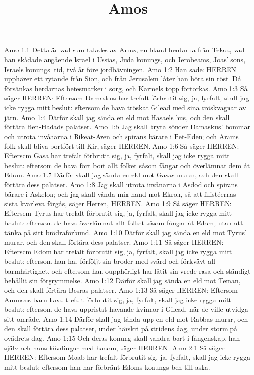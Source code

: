 

\title{Amos}

Amo 1:1  Detta är vad som talades av Amos, en bland herdarna från Tekoa, vad han skådade angående Israel i Ussias, Juda konungs, och Jerobeams, Joas' sons, Israels konungs, tid, två år före jordbävningen.
Amo 1:2  Han sade: HERREN upphäver ett rytande från Sion, och från Jerusalem låter han höra sin röst. Då försänkas herdarnas betesmarker i sorg, och Karmels topp förtorkas.
Amo 1:3  Så säger HERREN: Eftersom Damaskus har trefalt förbrutit sig, ja, fyrfalt, skall jag icke rygga mitt beslut: eftersom de hava tröskat Gilead med sina tröskvagnar av järn.
Amo 1:4  Därför skall jag sända en eld mot Hasaels hus, och den skall förtära Ben-Hadads palatser.
Amo 1:5  Jag skall bryta sönder Damaskus' bommar och utrota invånarna i Bikeat-Aven och spirans bärare i Bet-Eden; och Arams folk skall bliva bortfört till Kir, säger HERREN.
Amo 1:6  Så säger HERREN: Eftersom Gasa har trefalt förbrutit sig, ja, fyrfalt, skall jag icke rygga mitt beslut: eftersom de hava fört bort allt folket såsom fångar och överlämnat dem åt Edom.
Amo 1:7  Därför skall jag sända en eld mot Gasas murar, och den skall förtära dess palatser.
Amo 1:8  Jag skall utrota invånarna i Asdod och spirans bärare i Askelon; och jag skall vända min hand mot Ekron, så att filistéernas sista kvarleva förgås, säger Herren, HERREN.
Amo 1:9  Så säger HERREN: Eftersom Tyrus har trefalt förbrutit sig, ja, fyrfalt, skall jag icke rygga mitt beslut: eftersom de hava överlämnat allt folket såsom fångar åt Edom, utan att tänka på sitt brödraförbund.
Amo 1:10  Därför skall jag sända en eld mot Tyrus' murar, och den skall förtära dess palatser.
Amo 1:11  Så säger HERREN: Eftersom Edom har trefalt förbrutit sig, ja, fyrfalt, skall jag icke rygga mitt beslut: eftersom han har förföljt sin broder med svärd och förkvävt all barmhärtighet, och eftersom han oupphörligt har låtit sin vrede rasa och ständigt behållit sin förgrymmelse.
Amo 1:12  Därför skall jag sända en eld mot Teman, och den skall förtära Bosras palatser.
Amo 1:13  Så säger HERREN: Eftersom Ammons barn hava trefalt förbrutit sig, ja, fyrfalt, skall jag icke rygga mitt beslut: eftersom de hava uppristat havande kvinnor i Gilead, när de ville utvidga sitt område.
Amo 1:14  Därför skall jag tända upp en eld mot Rabbas murar, och den skall förtära dess palatser, under härskri på stridens dag, under storm på ovädrets dag.
Amo 1:15  Och deras konung skall vandra bort i fångenskap, han själv och hans hövdingar med honom, säger HERREN.
Amo 2:1  Så säger HERREN: Eftersom Moab har trefalt förbrutit sig, ja, fyrfalt, skall jag icke rygga mitt beslut: eftersom han har förbränt Edoms konungs ben till aska.

